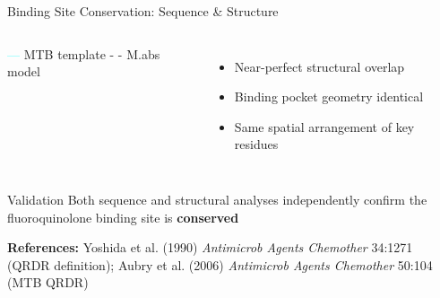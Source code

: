 \documentclass[aspectratio=169,xcolor=table]{beamer}
\begin{document}
\begin{frame}{Binding Site Conservation: Sequence \& Structure}
\begin{columns}
\begin{center}

\vspace{0.1cm}

\footnotesize
\textcolor{cyan}{---} MTB template \hspace{0.3cm} \textcolor{green!60!black}{- -} M.abs model
\end{center}

\begin{itemize}\setlength{\itemsep}{0pt}
    \item Near-perfect structural overlap
    \item Binding pocket geometry identical
    \item Same spatial arrangement of key residues
\end{itemize}
\end{columns}

\vspace{0.1cm}

\begin{block}{Validation}
Both sequence and structural analyses independently confirm the fluoroquinolone binding site is \textbf{conserved}
\end{block}

\vspace{0.1cm}
\footnotesize \textbf{References:} Yoshida et al. (1990) \textit{Antimicrob Agents Chemother} 34:1271 (QRDR definition); Aubry et al. (2006) \textit{Antimicrob Agents Chemother} 50:104 (MTB QRDR)

\end{frame}
\end{document}
